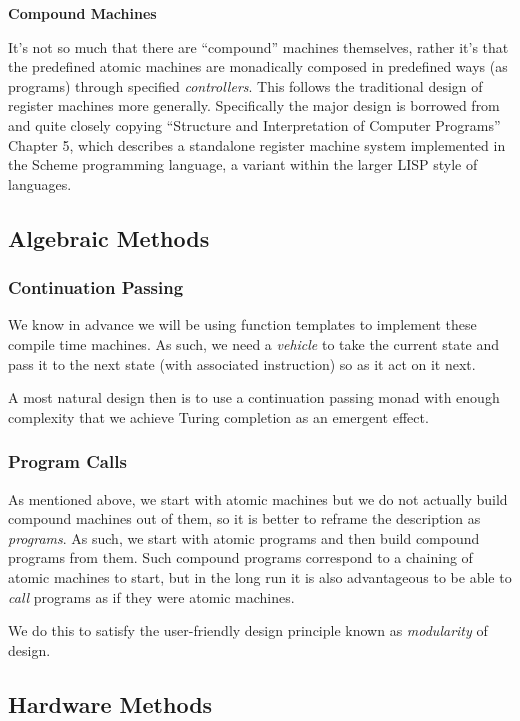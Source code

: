 \documentclass[twoside]{article}
\newcommand{\strong}[1]{{\bfseries #1}}
\begin{document}
\strong{Compound Machines}

It's not so much that there are ``compound'' machines themselves, rather it's that the predefined atomic machines
are monadically composed in predefined ways (as programs) through specified \emph{controllers}. This follows the
traditional design of register machines more generally. Specifically the major design is borrowed from and quite
closely copying ``Structure and Interpretation of Computer Programs'' Chapter 5, which describes a standalone register
machine system implemented in the Scheme programming language, a variant within the larger LISP style of languages.

\subsection*{Algebraic Methods}

\subsubsection*{Continuation Passing}

We know in advance we will be using function templates to implement these compile time machines.
As such, we need a \emph{vehicle} to take the current state and pass it to the next state
(with associated instruction) so as it act on it next.

A most natural design then is to use a continuation passing monad with enough complexity that we achieve Turing
completion as an emergent effect.

\subsubsection*{Program Calls}

As mentioned above, we start with atomic machines but we do not actually build compound machines out of them,
so it is better to reframe the description as \emph{programs}. As such, we start with atomic programs and then
build compound programs from them. Such compound programs correspond to a chaining of atomic machines to start,
but in the long run it is also advantageous to be able to \emph{call} programs as if they were atomic machines.

We do this to satisfy the user-friendly design principle known as \emph{modularity} of design.

\subsection*{Hardware Methods}
\end{document}
